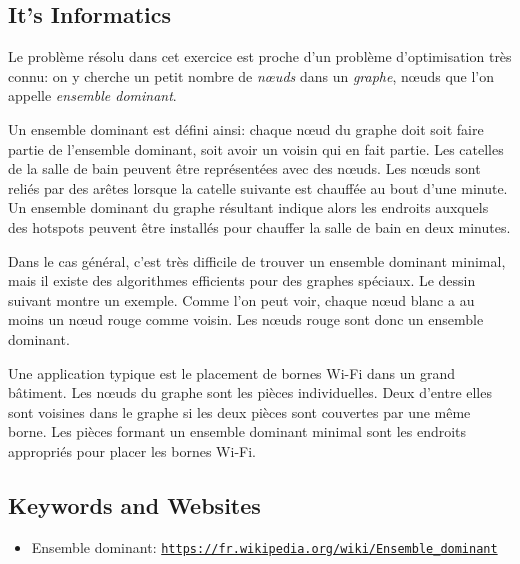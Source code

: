 \documentclass[a4paper,11pt]{report}
\newcommand{\BrochureUrlText}[1]{\texttt{#1}}
\newcommand{\taskGraphicsFolder}{..}
\begin{document}
\subsection*{It’s Informatics}

Le problème résolu dans cet exercice est proche d’un problème d’optimisation très connu: on y cherche un petit nombre de \emph{nœuds} dans un \emph{graphe}, nœuds que l’on appelle \emph{ensemble dominant}.

Un ensemble dominant est défini ainsi: chaque nœud du graphe doit soit faire partie de l’ensemble dominant, soit avoir un voisin qui en fait partie. Les catelles de la salle de bain peuvent être représentées avec des nœuds. Les nœuds sont reliés par des arêtes lorsque la catelle suivante est chauffée au bout d’une minute. Un ensemble dominant du graphe résultant indique alors les endroits auxquels des hotspots peuvent être installés pour chauffer la salle de bain en deux minutes.

Dans le cas général, c’est très difficile de trouver un ensemble dominant minimal, mais il existe des algorithmes efficients pour des graphes spéciaux. Le dessin suivant montre un exemple. Comme l’on peut voir, chaque nœud blanc a au moins un nœud rouge comme voisin. Les nœuds rouge sont donc un ensemble dominant.

{\centering%
\par}

Une application typique est le placement de bornes Wi-Fi dans un grand bâtiment. Les nœuds du graphe sont les pièces individuelles. Deux d’entre elles sont voisines dans le graphe si les deux pièces sont couvertes par une même borne. Les pièces formant un ensemble dominant minimal sont les endroits appropriés pour placer les bornes Wi-Fi.

{\raggedright

\subsection*{Keywords and Websites}

\begin{itemize}
  \item Ensemble dominant: \href{https://fr.wikipedia.org/wiki/Ensemble_dominant}{\BrochureUrlText{https://fr.wikipedia.org/wiki/Ensemble\_dominant}}
\end{itemize}


}
\end{document}
